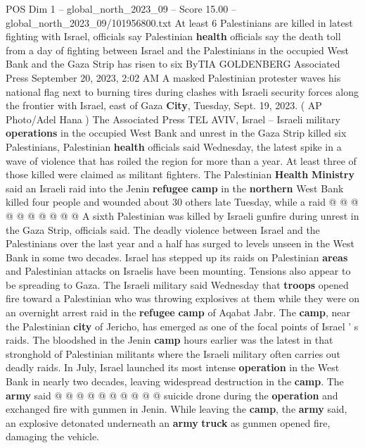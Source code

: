 \begin{textsample}{POS Dim 1 – global\_north\_2023\_09 – Score 15.00 – global\_north\_2023\_09/101956800.txt}  \label{ex:f1_pos_354}
At least 6 Palestinians are killed in latest fighting with Israel, officials say Palestinian \textbf{health} officials say the death toll from a day of fighting between Israel and the Palestinians in the occupied West Bank and the Gaza Strip has risen to six ByTIA GOLDENBERG Associated Press September 20, 2023, 2:02 AM A masked Palestinian protester waves his national flag next to burning tires during clashes with Israeli security forces along the frontier with Israel, east of Gaza \textbf{City}, Tuesday, Sept. 19, 2023. ( AP Photo/Adel Hana ) The Associated Press TEL AVIV, Israel -- Israeli military \textbf{operations} in the occupied West Bank and unrest in the Gaza Strip killed six Palestinians, Palestinian \textbf{health} officials said Wednesday, the latest spike in a wave of violence that has roiled the region for more than a year.
At least three of those killed were claimed as militant fighters.
The Palestinian \textbf{Health} \textbf{Ministry} said an Israeli raid into the Jenin \textbf{refugee} \textbf{camp} in the \textbf{northern} West Bank killed four people and wounded about 30 others late Tuesday, while a raid @ @ @ @ @ @ @ @ @ @ A sixth Palestinian was killed by Israeli gunfire during unrest in the Gaza Strip, officials said.
The deadly violence between Israel and the Palestinians over the last year and a half has surged to levels unseen in the West Bank in some two decades.
Israel has stepped up its raids on Palestinian \textbf{areas} and Palestinian attacks on Israelis have been mounting.
Tensions also appear to be spreading to Gaza.
The Israeli military said Wednesday that \textbf{troops} opened fire toward a Palestinian who was throwing explosives at them while they were on an overnight arrest raid in the \textbf{refugee} \textbf{camp} of Aqabat Jabr.
The \textbf{camp}, near the Palestinian \textbf{city} of Jericho, has emerged as one of the focal points of Israel ' s raids.
The bloodshed in the Jenin \textbf{camp} hours earlier was the latest in that stronghold of Palestinian militants where the Israeli military often carries out deadly raids.
In July, Israel launched its most intense \textbf{operation} in the West Bank in nearly two decades, leaving widespread destruction in the \textbf{camp}.
The \textbf{army} said @ @ @ @ @ @ @ @ @ @ suicide drone during the \textbf{operation} and exchanged fire with gunmen in Jenin.
While leaving the \textbf{camp}, the \textbf{army} said, an explosive detonated underneath an \textbf{army} \textbf{truck} as gunmen opened fire, damaging the vehicle.

\end{textsample}
